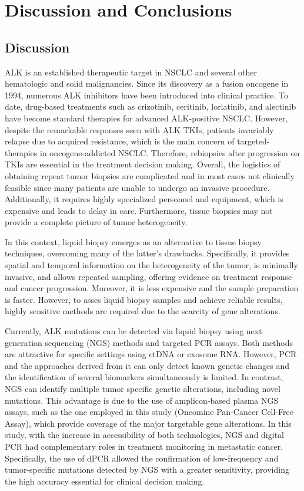\chapter{Discussion and Conclusions}

\section{Discussion}

ALK is an established therapeutic target in NSCLC and several other hematologic and solid malignancies. Since its discovery as a fusion oncogene in 1994, numerous ALK inhibitors have been introduced into clinical practice. To date, drug-based treatments such as crizotinib, ceritinib, lorlatinib, and alectinib have become standard therapies for advanced ALK-positive NSCLC. However, despite the remarkable responses seen with ALK TKIs, patients invariably relapse due to acquired resistance, which is the main concern of targeted-therapies in oncogene-addicted NSCLC. Therefore, rebiopsies after progression on TKIs are essential in the treatment decision making. Overall, the logistics of obtaining repeat tumor biopsies are complicated and in most cases not clinically feasible since many patients are unable to undergo an invasive procedure. Additionally, it requires highly specialized personnel and equipment, which is expensive and leads to delay in care. Furthermore, tissue biopsies may not provide a complete picture of tumor heterogeneity.

In this context, liquid biopsy emerges as an alternative to tissue biopsy techniques, overcoming many of the latter's drawbacks. Specifically, it provides spatial and temporal information on the heterogeneity of the tumor, is minimally invasive, and allows repeated sampling, offering evidence on treatment response and cancer progression. Moreover, it is less expensive and the sample preparation is faster. However, to asses liquid biopsy samples and achieve reliable results, highly sensitive methods are required due to the scarcity of gene alterations.

Currently, ALK mutations can be detected via liquid biopsy using next generation sequencing (NGS) methods and targeted PCR assays. Both methods are attractive for specific settings using ctDNA or exosome RNA. However, PCR and the approaches derived from it can only detect known genetic changes and the identification of several biomarkers simultaneously is limited. In contrast, NGS can identify multiple tumor specific genetic alterations, including novel mutations. This advantage is due to the use of amplicon‐based plasma NGS assays, such as the one employed in this study (Oncomine\texttrademark{} Pan-Cancer Cell-Free Assay), which provide coverage of the major targetable gene alterations. In this study, with the increase in accessibility of both technologies, NGS and digital PCR had complementary roles in treatment monitoring in metastatic cancer. Specifically, the use of dPCR allowed the confirmation of low-frequency and tumor-specific mutations detected by NGS with a greater sensitivity, providing the high accuracy essential for clinical decision making.

